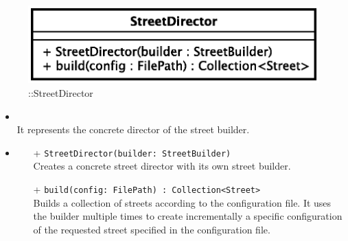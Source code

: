 \begin{figure}[h]
\centering
\includegraphics[scale=0.6,keepaspectratio]{images/solution/street_director.eps}
\caption{\pReactiveBuild::StreetDirector}
\label{fig:sd-app-street_director}
\end{figure}
\FloatBarrier
\begin{itemize}
  \item \textbf{\descr} \\
    It represents the concrete director of the street builder.
  \item \textbf{\ops}
  \begin{itemize} 
    \item[+] \texttt{StreetDirector(builder: StreetBuilder)} \\
Creates a concrete street director with its own street builder.
    \item[+] \texttt{build(config: FilePath) : Collection<Street>} \\
Builds a collection of streets according to the configuration file. 
It uses the builder multiple times to create incrementally a 
specific configuration of the requested street specified 
in the configuration file. 
  \end{itemize}
\end{itemize}
